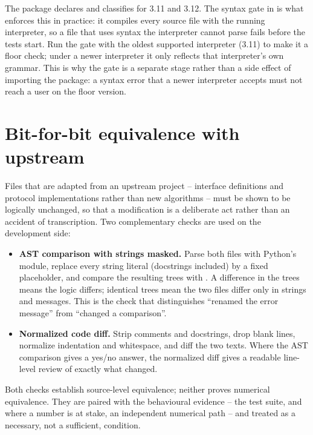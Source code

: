 The package declares  and classifies for
3.11 and 3.12.  The syntax gate in  is what enforces this in
practice: it compiles every source file with the running interpreter, so a
file that uses syntax the interpreter cannot parse fails before the tests
start.  Run the gate with the oldest supported interpreter (3.11) to make it
a floor check; under a newer interpreter it only reflects that interpreter's
own grammar.  This is why the gate is a separate stage rather than a side
effect of importing the package: a syntax error that a newer interpreter
accepts must not reach a user on the floor version.

\section{Bit-for-bit equivalence with upstream}
\label{sec:dev-equivalence}

Files that are adapted from an upstream project -- interface definitions and
protocol implementations rather than new algorithms -- must be shown to be
logically unchanged, so that a modification is a deliberate act rather than
an accident of transcription.  Two complementary checks are used on the
development side:

\begin{itemize}
  \item \textbf{AST comparison with strings masked.}  Parse both files with
        Python's  module, replace every string literal (docstrings
        included) by a fixed placeholder, and compare the resulting trees
        with .  A difference in the trees means the logic
        differs; identical trees mean the two files differ only in strings
        and messages.  This is the check that distinguishes ``renamed the
        error message'' from ``changed a comparison''.
  \item \textbf{Normalized code diff.}  Strip comments and docstrings, drop
        blank lines, normalize indentation and whitespace, and diff the two
        texts.  Where the AST comparison gives a yes/no answer, the
        normalized diff gives a readable line-level review of exactly what
        changed.
\end{itemize}

Both checks establish source-level equivalence; neither proves numerical
equivalence.  They are paired with the behavioural evidence -- the test
suite, and where a number is at stake, an independent numerical path -- and
treated as a necessary, not a sufficient, condition.

